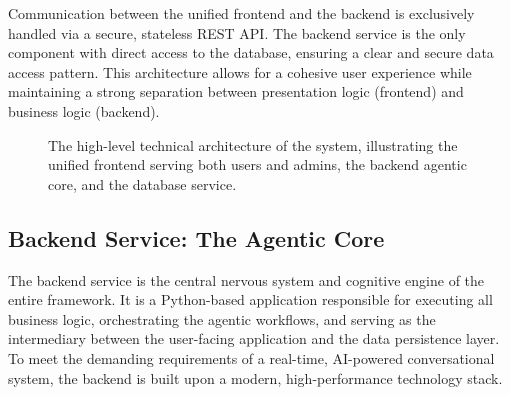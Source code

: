Communication between the unified frontend and the backend is exclusively handled via a secure, stateless REST API. The backend service is the only component with direct access to the database, ensuring a clear and secure data access pattern. This architecture allows for a cohesive user experience while maintaining a strong separation between presentation logic (frontend) and business logic (backend).

\begin{figure}[h]
    \centering
    \caption{The high-level technical architecture of the system, illustrating the unified frontend serving both users and admins, the backend agentic core, and the database service.}
    \label{fig:system_architecture_diagram}
\end{figure}

\subsection{Backend Service: The Agentic Core}
\label{sec:backend_service}

The backend service is the central nervous system and cognitive engine of the entire framework. It is a Python-based application responsible for executing all business logic, orchestrating the agentic workflows, and serving as the intermediary between the user-facing application and the data persistence layer. To meet the demanding requirements of a real-time, AI-powered conversational system, the backend is built upon a modern, high-performance technology stack.


